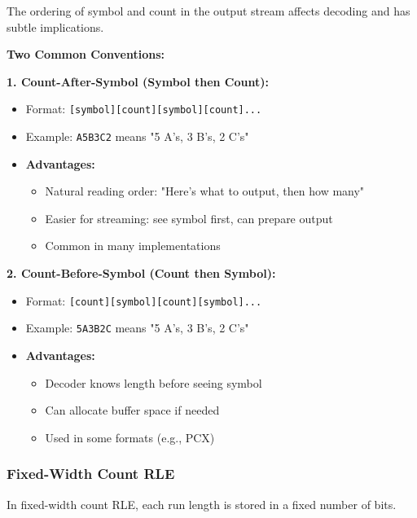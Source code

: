 The ordering of symbol and count in the output stream affects decoding and has subtle implications.

\begin{importantbox}
\textbf{Two Common Conventions:}

\textbf{1. Count-After-Symbol (Symbol then Count):}
\begin{itemize}
    \item Format: \texttt{[symbol][count][symbol][count]...}
    \item Example: \texttt{A5B3C2} means "5 A's, 3 B's, 2 C's"
    \item \textbf{Advantages:}
    \begin{itemize}
        \item Natural reading order: "Here's what to output, then how many"
        \item Easier for streaming: see symbol first, can prepare output
        \item Common in many implementations
    \end{itemize}
\end{itemize}

\textbf{2. Count-Before-Symbol (Count then Symbol):}
\begin{itemize}
    \item Format: \texttt{[count][symbol][count][symbol]...}
    \item Example: \texttt{5A3B2C} means "5 A's, 3 B's, 2 C's"
    \item \textbf{Advantages:}
    \begin{itemize}
        \item Decoder knows length before seeing symbol
        \item Can allocate buffer space if needed
        \item Used in some formats (e.g., PCX)
    \end{itemize}
\end{itemize}
\end{importantbox}

\subsubsection{Fixed-Width Count RLE}

In fixed-width count RLE, each run length is stored in a fixed number of bits.

